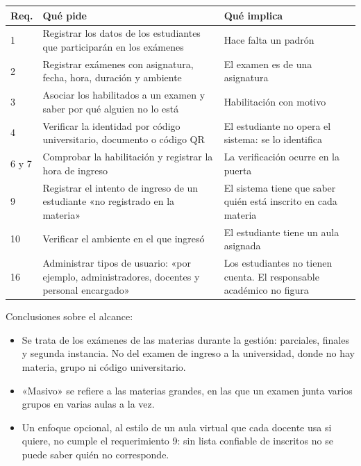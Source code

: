 \documentclass[11pt,letterpaper]{article}
\begin{document}
\begin{center}
\begin{longtable}{@{}C{1.1cm}L{8.2cm}L{6.4cm}@{}}
\hline
\textbf{Req.} & \textbf{Qué pide} & \textbf{Qué implica} \\
\hline
{} & Registrar los datos de los estudiantes que participarán en los exámenes & Hace falta un padrón \\
2 & Registrar exámenes con asignatura, fecha, hora, duración y ambiente & El examen es de una asignatura \\
3 & Asociar los habilitados a un examen y saber por qué alguien no lo está & Habilitación con motivo \\
4 & Verificar la identidad por código universitario, documento o código QR & El estudiante no opera el sistema: se lo identifica \\
6 y 7 & Comprobar la habilitación y registrar la hora de ingreso & La verificación ocurre en la puerta \\
9 & Registrar el intento de ingreso de un estudiante «no registrado en la materia» & El sistema tiene que saber quién está inscrito en cada materia \\
10 & Verificar el ambiente en el que ingresó & El estudiante tiene un aula asignada \\
16 & Administrar tipos de usuario: «por ejemplo, administradores, docentes y personal encargado» & Los estudiantes no tienen cuenta. El responsable académico no figura \\
\hline
\end{longtable}
\end{center}

Conclusiones sobre el alcance:

\begin{itemize}
  \item Se trata de los exámenes de las materias durante la gestión: parciales, finales y
        segunda instancia. No del examen de ingreso a la universidad, donde no hay
        materia, grupo ni código universitario.
  \item «Masivo» se refiere a las materias grandes, en las que un examen junta varios
        grupos en varias aulas a la vez.
  \item Un enfoque opcional, al estilo de un aula virtual que cada docente usa si quiere,
        no cumple el requerimiento 9: sin lista confiable de inscritos no se puede saber
        quién no corresponde.
\end{itemize}
\end{document}
